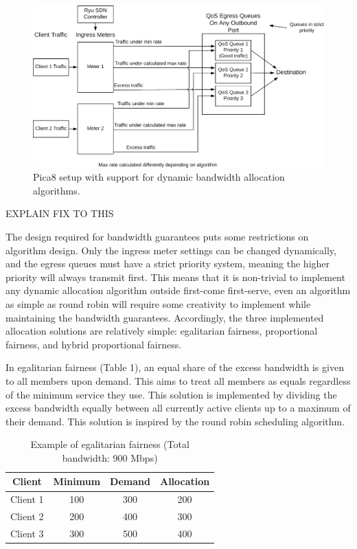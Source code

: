 \documentclass[accepted,single]{gipaper}
\begin{document}
\begin{figure}
	\centering
	\includegraphics[width=6in]{figs/dbaFramework.png}
	\caption{ Pica8 setup with support for dynamic bandwidth allocation algorithms. } \label{dbaDiag}
\end{figure}

EXPLAIN FIX TO THIS

The design required for bandwidth guarantees puts some restrictions on algorithm design. Only the ingress meter settings can be changed dynamically, and the egress queues must have a strict priority system, meaning the higher priority will always transmit first. This means that it is non-trivial to implement any dynamic allocation algorithm outside first-come first-serve, even an algorithm as simple as round robin will require some creativity to implement while maintaining the bandwidth guarantees. Accordingly, the three implemented allocation solutions are relatively simple: egalitarian fairness, proportional fairness, and hybrid proportional fairness.

In egalitarian fairness (Table 1), an equal share of the excess bandwidth is given to all members upon demand. This aims to treat all members as equals regardless of the minimum service they use. This solution is implemented by dividing the excess bandwidth equally between all currently active clients up to a maximum of their demand. This solution is inspired by the round robin scheduling algorithm.

\begin{table}[htpb]
	\label{egalitarian_table}
	\vspace{-3mm}
	\begin{center}
		\begin{small}
			\begin{tabular}{cccc}
				Client & Minimum & Demand & Allocation \\
				\hline
				Client 1 & 100 & 300 & 200 \\
				Client 2 & 200 & 400 & 300 \\
				Client 3 & 300 & 500 & 400 \\
			\end{tabular}
		\end{small}
	\end{center}
	\caption{Example of egalitarian fairness (Total bandwidth: 900 Mbps)}
	\vspace{-3mm}
\end{table}
\end{document}
